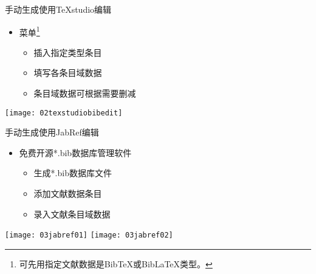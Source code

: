 \documentclass[fontset = none, t]{ctexbeamer}
\begin{document}
\begin{frame}[fragile]{手动生成}{使用TeXstudio编辑}
  \begin{spacing}{1.3}
    \begin{itemize}
    \item {}菜单\footnote[frame,2]{可先用指定文献数据是Bib\TeX 或Bib\LaTeX 类型。}
      \begin{itemize}
      \item 插入指定类型条目
      \item 填写各条目域数据
      \item 条目域数据可根据需要删减
      \end{itemize}
    \end{itemize}
    \begin{center}
      \texttt{[image: 02texstudiobibedit]}
    \end{center}
  \end{spacing}  
\end{frame}

\begin{frame}[fragile]{手动生成}{使用JabRef编辑}
  \begin{spacing}{1.5}
    \begin{itemize}
    \item 免费开源*.bib数据库管理软件
      \begin{itemize}
      \item 生成*.bib数据库文件
      \item 添加文献数据条目
      \item 录入文献条目域数据
      \end{itemize}
    \end{itemize}    
    \begin{center}
      \texttt{[image: 03jabref01]}\quad
      \texttt{[image: 03jabref02]}
    \end{center}
  \end{spacing}
\end{frame}
\end{document}

